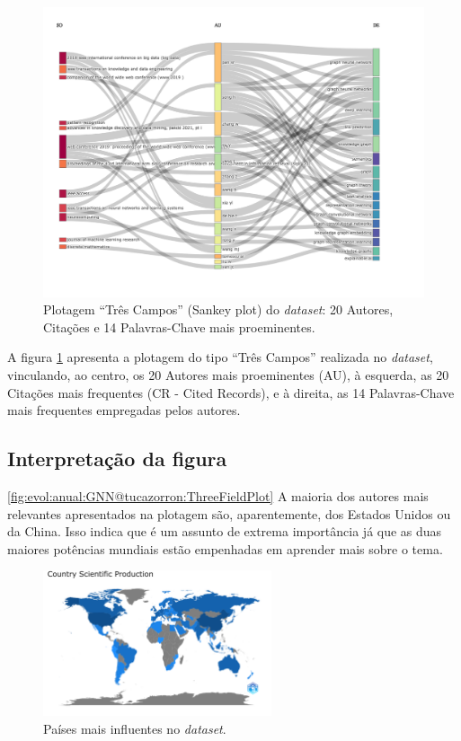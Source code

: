 \begin{figure}
    \centering
    \includegraphics[width=1\textwidth]{experiments/tucazorron/PesquisaBibliometrica/GNN/1.png}
    \caption{Plotagem ``Três Campos'' (Sankey plot) do \textit{dataset}: 20 Autores, Citações e 14 Palavras-Chave mais proeminentes.}
    \label{fig:GNN@tucazorron:ThreeFieldPlot}
\end{figure}

A figura \ref{fig:GNN@tucazorron:ThreeFieldPlot} apresenta a plotagem do tipo ``Três Campos'' realizada no \textit{dataset}, vinculando, ao centro, os 20 Autores mais proeminentes (AU), à esquerda, as 20 Citações mais frequentes (CR - Cited Records), e à direita, as 14 Palavras-Chave mais frequentes empregadas pelos autores.

\subsection{Interpretação da figura} \ref{fig:evol:anual:GNN@tucazorron:ThreeFieldPlot}
A maioria dos autores mais relevantes apresentados na plotagem são, aparentemente, dos Estados Unidos ou da China. Isso indica que é um assunto de extrema importância já que as duas maiores potências mundiais estão empenhadas em aprender mais sobre o tema.

\begin{figure}
    \centering
    \includegraphics[width=0.6\textwidth]{experiments/tucazorron/PesquisaBibliometrica/GNN/8.png}
    \caption{Países mais influentes no \textit{dataset}.}
    \label{fig:GNN@tucazorron:countries}
\end{figure}

